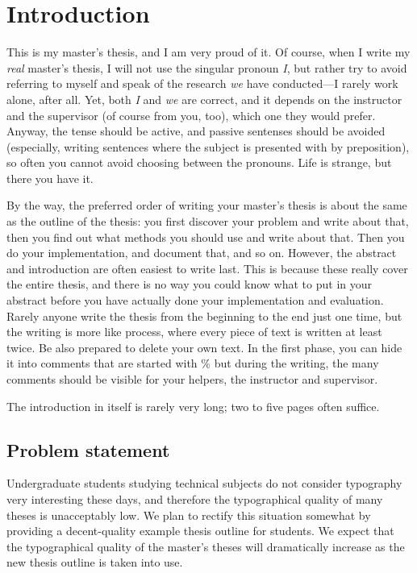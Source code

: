 \chapter{Introduction}
\label{chapter:intro}

This is my master's thesis, and I am very proud of it.  Of course,
when I write my \emph{real} master's thesis, I will not use the
singular pronoun \emph{I}, but rather try to avoid referring to myself
and speak of the research \emph{we} have conducted---I rarely work
alone, after all.  Yet, both \emph{I} and \emph{we} are correct, and
it depends on the instructor and the supervisor (of course from you,
too), which one they would prefer. Anyway, the tense should be active,
and passive sentenses should be avoided (especially, writing sentences
where the subject is presented with by preposition), so often you
cannot avoid choosing between the pronouns. Life is strange, but there
you have it.

By the way, the preferred order of writing your master's thesis is
about the same as the outline of the thesis: you first discover your
problem and write about that, then you find out what methods you
should use and write about that.  Then you do your implementation, and
document that, and so on.  However, the abstract and introduction are
often easiest to write last.  This is because these really cover the
entire thesis, and there is no way you could know what to put in your
abstract before you have actually done your implementation and
evaluation. Rarely anyone write the thesis from the beginning to the
end just one time, but the writing is more like process, where every
piece of text is written at least twice. Be also prepared to delete
your own text. In the first phase, you can hide it into comments that
are started with \% but during the writing, the many comments should be
visible for your helpers, the instructor and supervisor.

The introduction in itself is rarely very long; two to five pages often
suffice.


\section{Problem statement}

Undergraduate students studying technical subjects do not consider typography
very interesting these days, and therefore the typographical quality of many
theses is unacceptably low. 
We plan to rectify this situation somewhat by providing a decent-quality
example thesis outline for students.
We expect that the typographical quality of the master's theses will
dramatically increase as the new thesis outline is taken into use.

